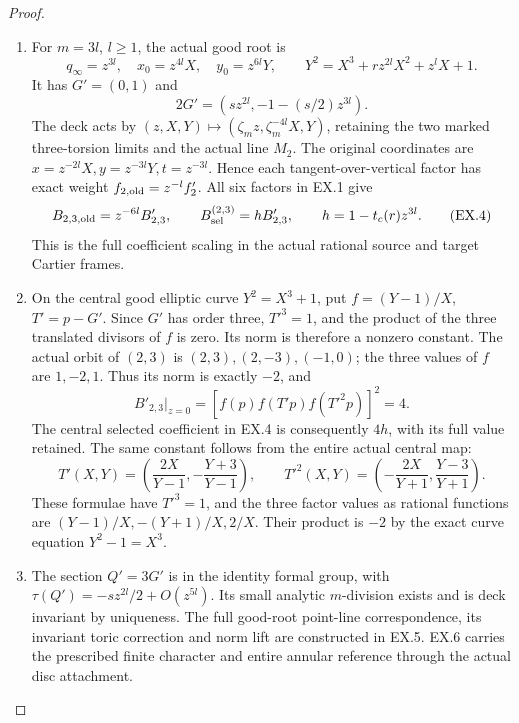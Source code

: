 \begin{proof}
\begin{enumerate}[label=\arabic*.]
\par

\medskip\noindent\textbf{EX.2. The literal good root and its central multiplier}

\par\nobreak

\item For \(m=3l\), \(l\ge1\), the actual good root is
\[
 q_\infty=z^{3l},\quad x_0=z^{4l}X,\quad y_0=z^{6l}Y,
 \qquad Y^2=X^3+r z^{2l}X^2+z^lX+1.
 \tag{EX.3}
\]
It has \(G'=(0,1)\) and
\[
 2G'=(s z^{2l},-1-(s/2)z^{3l}).
\]
The deck acts by \((z,X,Y)\mapsto
(\zeta_m z,\zeta_m^{-4l}X,Y)\), retaining the two marked
three-torsion limits and the actual line \(M_2\).
The original coordinates are \(x=z^{-2l}X,y=z^{-3l}Y,t=z^{-3l}\).
Hence each tangent-over-vertical factor has exact weight
\(f_{2,\rm old}=z^{-l}f'_2\). All six factors in EX.1 give
\[
 B_{2,3,\rm old}=z^{-6l}B'_{2,3},\qquad
 B^{(2,3)}_{\rm sel}=h B'_{2,3},\qquad
 h=1-t_c(r)z^{3l}.
 \tag{EX.4}
\]
This is the full coefficient scaling in the actual rational
source and target Cartier frames.

\item On the central good elliptic curve \(Y^2=X^3+1\), put
\(f=(Y-1)/X\), \(T'=p-G'\). Since \(G'\) has order three,
\(T'^3=1\), and the product of the three translated divisors
of \(f\) is zero. Its norm is therefore a nonzero constant.
The actual orbit of \((2,3)\) is
\((2,3),(2,-3),(-1,0)\); the three values of \(f\) are
\(1,-2,1\). Thus its norm is exactly \(-2\), and
\[
 B'_{2,3}|_{z=0}
   =[f(p)f(T'p)f(T'^2p)]^2=4.
 \tag{EX.5}
\]
The central selected coefficient in EX.4 is consequently \(4h\),
with its full value retained.
The same constant follows from the entire actual central map:
\[
 T'(X,Y)=\left(\frac{2X}{Y-1},-\frac{Y+3}{Y-1}\right),\qquad
 T'^2(X,Y)=\left(-\frac{2X}{Y+1},\frac{Y-3}{Y+1}\right).
\]
These formulae have \(T'^3=1\), and the three factor values as
rational functions are \((Y-1)/X,-(Y+1)/X,2/X\). Their product
is \(-2\) by the exact curve equation \(Y^2-1=X^3\).

\item The section \(Q'=3G'\) is in the identity formal group, with
\(\tau(Q')=-s z^{2l}/2+O(z^{5l})\). Its small analytic
\(m\)-division exists and is deck invariant by uniqueness.
The full good-root point-line correspondence, its invariant toric
correction and norm lift are constructed in EX.5. EX.6 carries
the prescribed finite character and entire annular reference
through the actual disc attachment.


\end{enumerate}
\end{proof}

